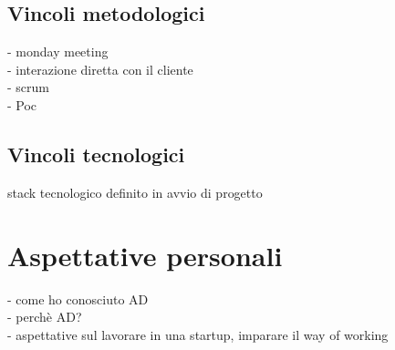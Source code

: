 \subsection{Vincoli metodologici}
- monday meeting\\
- interazione diretta con il cliente\\
- scrum\\
- Poc\\
\subsection{Vincoli tecnologici}
stack tecnologico definito in avvio di progetto 

\section{Aspettative personali}
- come ho conosciuto AD\\
- perchè AD?\\
- aspettative sul lavorare in una startup, imparare il way of working\\